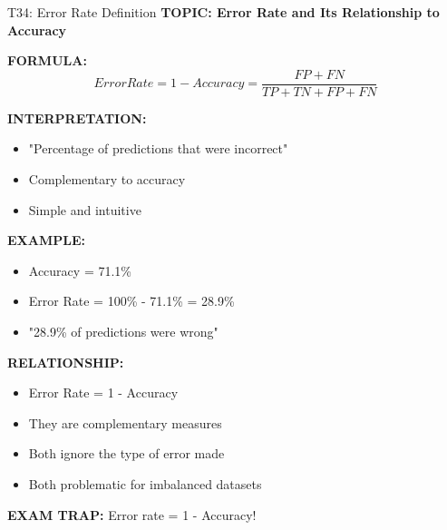 \documentclass[8pt]{beamer}
\begin{document}
	\begin{frame}{T34: Error Rate Definition}
		\fontsize{6.5}{7.5}\selectfont
		\textbf{TOPIC: Error Rate and Its Relationship to Accuracy}
		
		\vspace{0.1cm}
		\textbf{FORMULA:}
		\[
		Error Rate = 1 - Accuracy = \frac{FP + FN}{TP + TN + FP + FN}
		\]
		
		\vspace{0.1cm}
		\textbf{INTERPRETATION:}
		\begin{itemize}
			\item "Percentage of predictions that were incorrect"
			\item Complementary to accuracy
			\item Simple and intuitive
		\end{itemize}
		
		\vspace{0.1cm}
		\textbf{EXAMPLE:}
		\begin{itemize}
			\item Accuracy = 71.1\%
			\item Error Rate = 100\% - 71.1\% = 28.9\%
			\item "28.9\% of predictions were wrong"
		\end{itemize}
		
		\vspace{0.1cm}
		\textbf{RELATIONSHIP:}
		\begin{itemize}
			\item Error Rate = 1 - Accuracy
			\item They are complementary measures
			\item Both ignore the type of error made
			\item Both problematic for imbalanced datasets
		\end{itemize}
		
		\textcolor{myred}{\textbf{EXAM TRAP:}} Error rate = \textcolor{myblue}{1 - Accuracy}!
	\end{frame}
	
\end{document}
